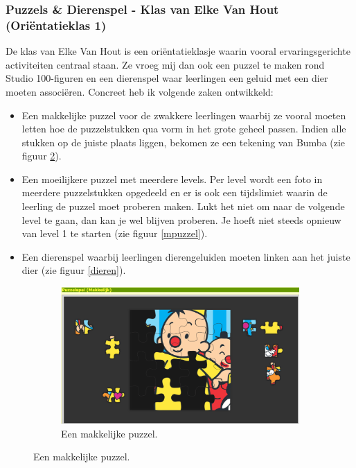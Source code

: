 \documentclass[a4paper,11pt]{article}
\theoremstyle{definition}
\begin{document}
\begin{itemize}
\begin{itemize}
\subsubsection{Puzzels \& Dierenspel - Klas van Elke Van Hout (Oriëntatieklas 1)}
De klas van Elke Van Hout is een oriëntatieklasje waarin vooral 
ervaringsgerichte activiteiten centraal staan. Ze vroeg mij dan ook een puzzel 
te maken rond Studio 100-figuren en een dierenspel waar leerlingen een geluid 
met een dier moeten associëren. Concreet heb ik volgende zaken ontwikkeld:

\begin{itemize}
  \item Een makkelijke puzzel voor de zwakkere leerlingen waarbij ze vooral 
  moeten letten hoe de puzzelstukken qua vorm in het grote geheel passen. Indien 
  alle stukken op de juiste plaats liggen, bekomen ze een tekening van Bumba (zie figuur 
  \ref{bumba}).
  \item Een moeilijkere puzzel met meerdere levels. Per level wordt een foto in 
  meerdere puzzelstukken opgedeeld en er is ook een tijdslimiet waarin de 
  leerling de puzzel moet proberen maken. Lukt het niet om naar de volgende 
  level te gaan, dan kan je wel blijven proberen. Je hoeft niet steeds opnieuw 
  van level 1 te starten (zie figuur \ref{mpuzzel}).
  \item Een dierenspel waarbij leerlingen dierengeluiden moeten linken aan het 
  juiste dier (zie figuur \ref{dieren}).
\end{itemize}
\begin{figure}[h!]
        \centering
        \begin{subfigure}{.5\textwidth}
          \centering
                \includegraphics[scale=0.085]{bumba.jpg}
                \caption{Een makkelijke puzzel.}
                \label{bumba}

\end{subfigure}
\end{figure}
\end{itemize}
\end{itemize}
\end{document}
